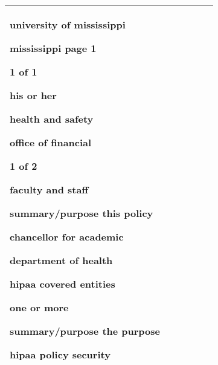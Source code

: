 \documentclass[a4paper,11pt]{article}
\theoremstyle{mytheor}
\begin{document}
\begin{tabular}{|*6{P{0.16}}|}
{      \begin{tabitemize}
      \item university of mississippi
      \item mississippi page 1
      \item 1 of 1
      \item his or her
      \item health and safety
      \item office of financial
      \item 1 of 2
      \item faculty and staff
      \item summary/purpose this policy
      \item chancellor for academic
      \item department of health
      \item hipaa covered entities
      \item one or more
      \item summary/purpose the purpose
      \item hipaa policy security
      \end{tabitemize}}\\ \hline
\end{tabular}
\end{document}
